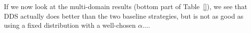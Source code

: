 \documentclass[11pt,a4paper]{article}
\newcommand{\fyTodo}[1]{\Todo[FY:]{\textcolor{orange}{#1}}}
\newcommand{\domain}[1]{\texttt{\textsc{#1}}}
\newcommand{\system}[1]{\texttt{{#1}}}
\begin{document}
If we now look at the multi-domain results (bottom part of Table~\ref{}), we see that DDS actually does better than the two baseline strategies, but is not as good as using a fixed distribution with a well-chosen $\alpha$....\fyTodo{To be continued}

\end{document}
